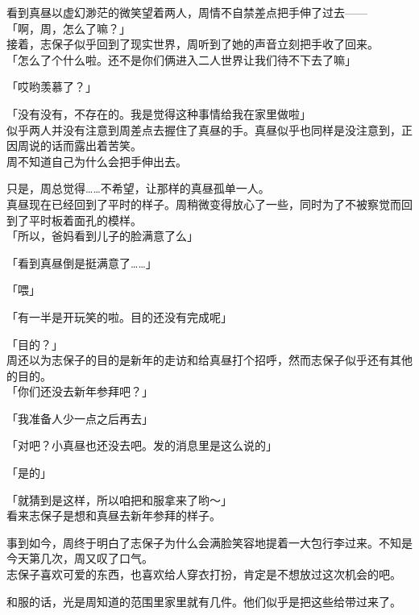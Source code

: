 看到真昼以虚幻渺茫的微笑望着两人，周情不自禁差点把手伸了过去——\\

「啊，周，怎么了嘛？」\\

接着，志保子似乎回到了现实世界，周听到了她的声音立刻把手收了回来。\\

「怎么了个什么啦。还不是你们俩进入二人世界让我们待不下去了嘛」

「哎哟羡慕了？」

「没有没有，不存在的。我是觉得这种事情给我在家里做啦」\\

似乎两人并没有注意到周差点去握住了真昼的手。真昼似乎也同样是没注意到，正因周说的话而露出着苦笑。\\

周不知道自己为什么会把手伸出去。

只是，周总觉得……不希望，让那样的真昼孤单一人。\\

真昼现在已经回到了平时的样子。周稍微变得放心了一些，同时为了不被察觉而回到了平时板着面孔的模样。\\

「所以，爸妈看到儿子的脸满意了么」

「看到真昼倒是挺满意了……」

「喂」

「有一半是开玩笑的啦。目的还没有完成呢」

「目的？」\\

周还以为志保子的目的是新年的走访和给真昼打个招呼，然而志保子似乎还有其他的目的。\\

「你们还没去新年参拜吧？」

「我准备人少一点之后再去」

「对吧？小真昼也还没去吧。发的消息里是这么说的」

「是的」

「就猜到是这样，所以咱把和服拿来了哟～」\\

看来志保子是想和真昼去新年参拜的样子。

事到如今，周终于明白了志保子为什么会满脸笑容地提着一大包行李过来。不知是今天第几次，周又叹了口气。\\

志保子喜欢可爱的东西，也喜欢给人穿衣打扮，肯定是不想放过这次机会的吧。

和服的话，光是周知道的范围里家里就有几件。他们似乎是把这些给带过来了。\\

